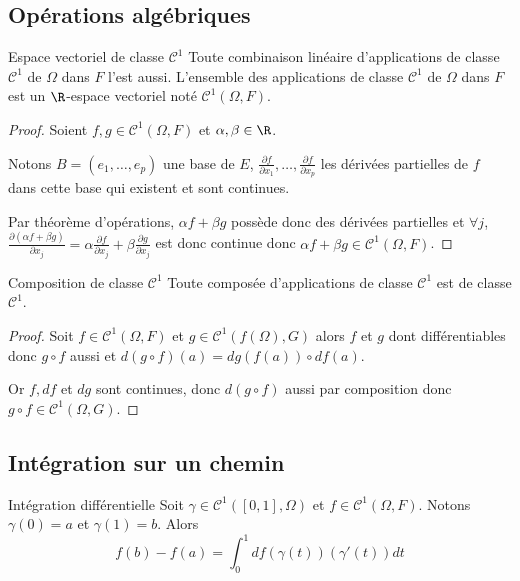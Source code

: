 \subsection{Opérations algébriques }

\begin{theoreme}{Espace vectoriel de classe $\mathscr C^1$}{}
    Toute combinaison linéaire d'applications de classe $\mathscr C^1$ de $\Omega$ dans $F$
    l'est aussi. L'ensemble des applications de classe $\mathscr C^1$ de $\Omega$ dans $F$ 
    est un $\R$-espace vectoriel noté $\mathscr C^1(\Omega, F)$.
\end{theoreme}

\begin{proof}
    Soient $f, g \in \mathscr C^1(\Omega, F)$ et $\alpha, \beta \in \R$. 

    Notons $B= (e_1, \ldots, e_p)$ une base de $E$, 
    $\displaystyle \frac{\partial f}{\partial x_1}, \ldots, \frac{\partial f}{\partial x_p}$
    les dérivées partielles de $f$ dans cette base qui existent et sont continues. 

    Par théorème d'opérations, $\alpha f + \beta g$ possède donc 
    des dérivées partielles et $\forall j$, $\displaystyle \frac{\partial (\alpha f + \beta g)}{\partial x_j} = \alpha \frac{\partial f}{\partial x_j} + \beta \frac{\partial g}{\partial x_j}$
    est donc continue donc $\alpha f + \beta g \in \mathscr C^1(\Omega, F)$.
\end{proof}

\begin{proposition}{Composition de classe $\mathscr C^1$}{}
    Toute composée d'applications de classe $\mathscr C^1$ est de classe $\mathscr C^1$.
\end{proposition}

\begin{proof}
    Soit $f \in \mathscr C^1(\Omega, F)$ et $g \in \mathscr C^1(f(\Omega), G)$ alors 
    $f$ et $g$ dont différentiables donc $g \circ f$ aussi et 
    $d(g \circ f)(a) = dg(f(a)) \circ df(a)$.

    Or $f, df$ et $dg$ sont continues, donc $d(g \circ f)$ aussi 
    par composition donc $g \circ f \in \mathscr C^1(\Omega, G)$.
\end{proof}


\subsection{Intégration sur un chemin}

\begin{theoreme}{Intégration différentielle}{}
    Soit $\gamma \in \mathscr C^1([0, 1], \Omega)$ et $f \in \mathscr C^1(\Omega, F)$. 
    Notons $\gamma(0) = a$ et $\gamma(1) = b$. Alors 
    $$f(b) - f(a) = \int_0^1 df(\gamma(t))(\gamma'(t)) dt$$
\end{theoreme}

